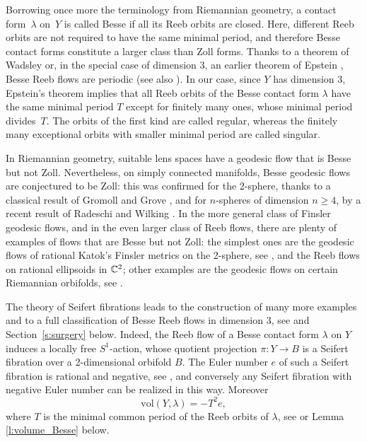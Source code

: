 \documentclass[10pt,a4paper]{amsart}
\theoremstyle{definition}
\newcommand{\vol}{\mathrm{vol}}
\let\eul e
\begin{document}
Borrowing once more the terminology from Riemannian geometry, a contact form~$\lambda$ on~$Y$ is called Besse if all its Reeb orbits are closed. Here, different Reeb orbits are not required to have the same minimal period, and therefore Besse contact forms constitute a larger class than Zoll forms. Thanks to a theorem of Wadsley \cite{Wadsley:1975sp} or, in the special case of dimension $3$, an earlier theorem of Epstein \cite{Epstein:1972}, Besse Reeb flows are periodic (see also \cite{Sullivan:1978}). In our case, since $Y$ has dimension $3$, Epstein's theorem implies that all Reeb orbits of the Besse contact form $\lambda$ have the same minimal period $T$ except for finitely many ones, whose minimal period divides~$T$. The orbits of the first kind are called regular, whereas the finitely many exceptional orbits with smaller minimal period are called singular.

In Riemannian geometry, suitable lens spaces have a geodesic flow that is Besse but not Zoll. Nevertheless, on simply connected manifolds, Besse geodesic flows are conjectured to be Zoll: this was confirmed for the 2-sphere, thanks to a classical result of Gromoll and Grove \cite{Gromoll:1981kl}, and for $n$-spheres of dimension $n\geq 4$, by a recent result of Radeschi and Wilking \cite{Radeschi:2017dz}. In the more general class of Finsler geodesic flows, and in the even larger class of Reeb flows, there are plenty of examples of flows that are Besse but not Zoll: the simplest ones are the geodesic flows of rational Katok's Finsler metrics on the 2-sphere, see \cite{Katok:1973mw,Ziller:1983rw}, and the Reeb flows on rational ellipsoids in $\mathbb{C}^2$; other examples are the geodesic flows on certain Riemannian orbifolds, see \cite{Besse:1978pr,Lange:2020,Lange:2021}.

The theory of Seifert fibrations leads to the construction of many more examples and to a full classification of Besse Reeb flows in dimension $3$, see \cite{Kegel:2021vo} and Section~\ref{s:surgery} below. Indeed, the Reeb flow of a Besse contact form $\lambda$ on $Y$ induces a locally free $S^1$-action, whose quotient projection $\pi: Y \to B$ is a Seifert fibration over a 2-dimensional orbifold $B$. The Euler number $\eul$ of such a Seifert fibration is rational and negative, see \cite{Lisca:2004oz}, and conversely any Seifert fibration with negative Euler number can be realized in this way. Moreover
\begin{equation}
\label{volumeBesse}
\vol(Y,\lambda) = -T^2 \eul,
\end{equation}
where $T$ is the minimal common period of the Reeb orbits of $\lambda$, see \cite[Cor.\,6.3]{Geiges:2020aa} or Lemma \ref{l:volume_Besse} below.
\end{document}
